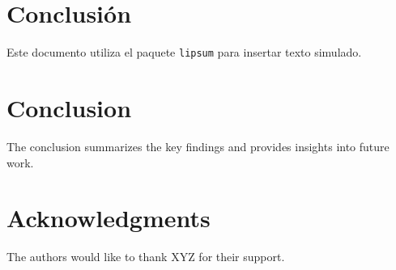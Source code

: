 \documentclass[conference]{IEEEtran}
\begin{document}
\begin{Form}
\section{Conclusión}
Este documento utiliza el paquete \texttt{lipsum} para insertar texto simulado.
\lipsum[6]
\section{Conclusion}
The conclusion summarizes the key findings and provides insights into future work.

\section*{Acknowledgments}
The authors would like to thank XYZ for their support.




\end{Form}
\end{document}
